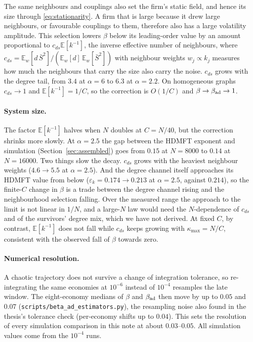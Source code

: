 \documentclass[11pt]{article}
\newcommand{\E}{\mathbb E}
\theoremstyle{remark}
\begin{document}
The same neighbours and couplings also set the firm's static field, and hence its size through
\eqref{eq:stationarity}.  A firm that is large because it drew large neighbours, or favourable
couplings to them, therefore also has a large volatility amplitude.  This selection lowers
$\beta$ below its leading-order value by an amount proportional to $c_{ds}\E[k^{-1}]$, the
inverse effective number of neighbours, where
$c_{ds}=\E_w[d\,\bar S^2]/(\E_w[d]\,\E_w[\bar S^2])$ with neighbour weights $w_j\propto k_j$
measures how much the neighbours that carry the size also carry the noise.  $c_{ds}$ grows with
the degree tail, from $3.4$ at $\alpha=6$ to $6.3$ at $\alpha=2.2$.  On homogeneous graphs
$c_{ds}\to1$ and $\E[k^{-1}]=1/C$, so the correction is $O(1/C)$ and $\beta\to\beta_{\rm ad}\to1$.

\paragraph{System size.}
The factor $\E[k^{-1}]$ halves when $N$ doubles at $C=N/40$, but the correction shrinks more
slowly.  At $\alpha=2.5$ the gap between the HDMFT exponent and simulation
(Section~\ref{sec:assembled}) goes from $0.15$ at $N=8000$ to $0.14$ at $N=16000$.  Two things
slow the decay.  $c_{ds}$ grows with the heaviest neighbour weights ($4.6\to5.5$ at
$\alpha=2.5$).  And the degree channel itself approaches its HDMFT value from below
($\varepsilon_k=0.174\to0.213$ at $\alpha=2.5$, against $0.214$), so the finite-$C$ change in
$\beta$ is a trade between the degree channel rising and the neighbourhood selection falling.
Over the measured range the approach to the limit is not linear in $1/N$, and a large-$N$ law
would need the $N$-dependence of $c_{ds}$ and of the survivors' degree mix, which we have not
derived.  At fixed $C$, by contrast, $\E[k^{-1}]$ does not fall while $c_{ds}$ keeps growing with
$\kappa_{\max}=N/C$, consistent with the observed fall of $\beta$ towards zero.

\paragraph{Numerical resolution.}
A chaotic trajectory does not survive a change of integration tolerance, so re-integrating the
same economies at $10^{-6}$ instead of $10^{-4}$ resamples the late window.  The eight-economy
medians of $\beta$ and $\beta_{\rm ad}$ then move by up to $0.05$ and $0.07$
(\texttt{scripts/\allowbreak beta\_\allowbreak ad\_\allowbreak estimators.py}), the resampling noise also found in the thesis's
tolerance check (per-economy shifts up to $0.04$).  This sets the resolution of every
simulation comparison in this note at about $0.03$--$0.05$.  All simulation values come from
the $10^{-4}$ runs.
\end{document}
